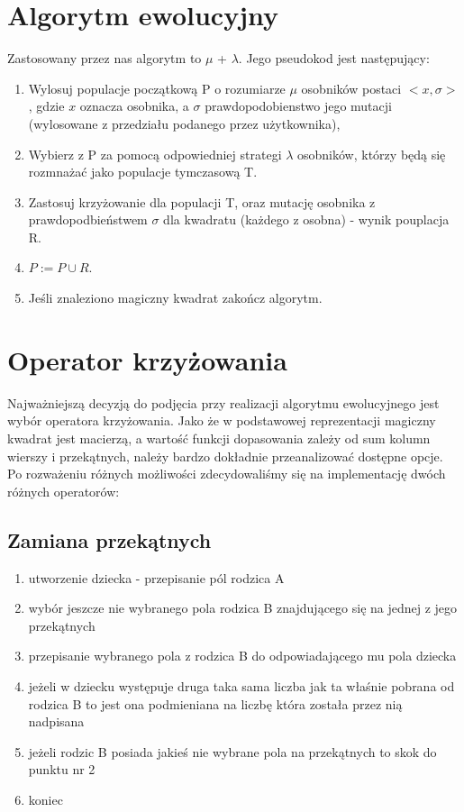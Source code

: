\documentclass[a4paper,twoside,10pt]{article}
\begin{document}
\section{Algorytm ewolucyjny}
Zastosowany przez nas algorytm to $\mu$ +  $\lambda$. Jego pseudokod jest następujący:
		\begin{enumerate}
			\item Wylosuj populacje początkową P o rozumiarze $\mu$ osobników postaci $<x,\sigma>$, gdzie $x$ oznacza osobnika, a $\sigma$ prawdopodobienstwo jego mutacji (wylosowane z przedziału podanego przez użytkownika),
			\item Wybierz z P za pomocą odpowiedniej strategi $\lambda$ osobników, którzy będą się rozmnażać jako populacje tymczasową T.
			\item Zastosuj krzyżowanie dla populacji T, oraz mutację osobnika z prawdopodbieństwem $\sigma$  dla kwadratu (każdego z osobna) - wynik pouplacja R.
			\item $P := P \cup R$.
			\item Jeśli znaleziono magiczny kwadrat zakończ algorytm.
		\end{enumerate}
\section{Operator krzyżowania}
	Najważniejszą decyzją do podjęcia przy realizacji algorytmu ewolucyjnego jest wybór operatora krzyżowania. Jako że w podstawowej reprezentacji magiczny kwadrat jest macierzą, a wartość funkcji dopasowania zależy od sum kolumn wierszy i przekątnych, należy bardzo dokładnie przeanalizować dostępne opcje. Po rozważeniu różnych możliwości zdecydowaliśmy się na implementację dwóch różnych operatorów:
		\subsection{Zamiana przekątnych}
		\begin{enumerate}
			\item utworzenie dziecka - przepisanie pól rodzica A
			\item wybór jeszcze nie wybranego pola rodzica B znajdującego się na jednej z jego przekątnych
			\item przepisanie wybranego pola z rodzica B do odpowiadającego mu pola dziecka
			\item jeżeli w dziecku występuje druga taka sama liczba jak ta właśnie pobrana od rodzica B to jest ona podmieniana na liczbę która została przez nią nadpisana
			\item jeżeli rodzic B posiada jakieś nie wybrane pola na przekątnych to skok do punktu nr 2
			\item koniec
		\end{enumerate}
\end{document}
